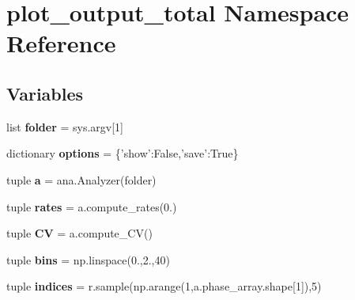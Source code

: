 \hypertarget{namespaceplot__output__total}{\section{plot\-\_\-output\-\_\-total Namespace Reference}
\label{namespaceplot__output__total}
}
\subsection*{Variables}
\begin{DoxyCompactItemize}
\item 
\hypertarget{namespaceplot__output__total_add8a6011293236c5ddf3f4a536b463cf}{list {\bfseries folder} = sys.\-argv\mbox{[}1\mbox{]}}\label{namespaceplot__output__total_add8a6011293236c5ddf3f4a536b463cf}

\item 
\hypertarget{namespaceplot__output__total_a356fcff60099ed238bdedd61f3440617}{dictionary {\bfseries options} = \{'show'\-:False,'save'\-:True\}}\label{namespaceplot__output__total_a356fcff60099ed238bdedd61f3440617}

\item 
\hypertarget{namespaceplot__output__total_a7200079fe7543fe7d95c9a11cf50a818}{tuple {\bfseries a} = ana.\-Analyzer(folder)}\label{namespaceplot__output__total_a7200079fe7543fe7d95c9a11cf50a818}

\item 
\hypertarget{namespaceplot__output__total_a78590c34bb1312dbfa08b63b8409460c}{tuple {\bfseries rates} = a.\-compute\-\_\-rates(0.)}\label{namespaceplot__output__total_a78590c34bb1312dbfa08b63b8409460c}

\item 
\hypertarget{namespaceplot__output__total_aa41b0492cbb2bfc38faf2a56ad68a596}{tuple {\bfseries C\-V} = a.\-compute\-\_\-\-C\-V()}\label{namespaceplot__output__total_aa41b0492cbb2bfc38faf2a56ad68a596}

\item 
\hypertarget{namespaceplot__output__total_ac4e49d662ef96a1e620807a150e56e0a}{tuple {\bfseries bins} = np.\-linspace(0.,2.,40)}\label{namespaceplot__output__total_ac4e49d662ef96a1e620807a150e56e0a}

\item 
\hypertarget{namespaceplot__output__total_ac7d3c2f5a85929e42c92a4f2bc8e1dc9}{tuple {\bfseries indices} = r.\-sample(np.\-arange(1,a.\-phase\-\_\-array.\-shape\mbox{[}1\mbox{]}),5)}\label{namespaceplot__output__total_ac7d3c2f5a85929e42c92a4f2bc8e1dc9}

\end{DoxyCompactItemize}


